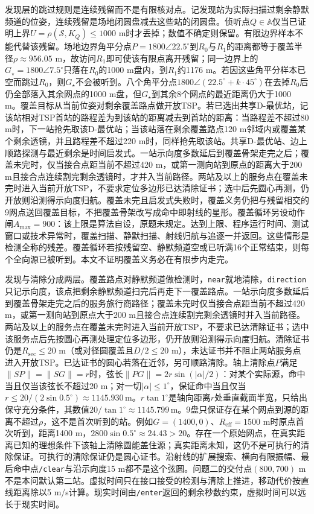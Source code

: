 \documentclass{cumcmthesis}
\begin{document}
发现层的跳过规则是连续残留而不是有限核对点。记发现站为实际扫描过剩余静默频道的位姿，连续残留是场地闭圆盘减去这些站的闭圆盘。侦听点$Q\in\mathbb{A}$仅当已证明上界$U=\rho(\mathcal{S},K_Q)\le 1000$ m时才丢掉；数值不确定则保留。有限边界样本不能代替该残留。场地边界角平分点$P=1800\angle 22.5^\circ$到$R_0$与$R_1$的距离都等于覆盖半径$\rho\approx 956.05$ m，故访问$R_1$即可使该有限点离开残留；同一边界上的$G_\star=1800\angle 7.5^\circ$只落在$R_0$的1000 m盘内，到$R_1$约1176 m。若因这些角平分样本已空而跳过$R_0$，则$G_\star$不会被听到。八个角平分点$1800\angle(22.5^\circ+k\cdot 45^\circ)$在去掉$R_0$后仍全部落入其余网点的1000 m盘，但$G_\star$到其余8个网点的最近距离仍大于1000 m。覆盖目标从当前位姿对剩余覆盖路点做开放TSP。若已选出共享D-最优站，记该站相对TSP首站的路程差为到该站的距离减去到首站的距离：当路程差不超过80 m时，下一站抢先取该D-最优站；当该站落在剩余覆盖路点120 m邻域内或覆盖某个剩余透镜，并且路程差不超过220 m时，同样抢先取该站。共享D-最优站、边上顺路探测与最近剩余是时间启发式。一站示向度多数延后到覆盖骨架走完之后；覆盖未完时，仅当接合点距当前不超过420 m，或第一测向站到原点的距离大于200 m且接合点连续割完剩余透镜时，才并入当前路径。两站及以上的服务点在覆盖未完时进入当前开放TSP，不要求定位多边形已达清除证书；选中后先圆心再测，仍开放则沿测得示向度归航。覆盖未完且启发式失败时，覆盖义务仍把与残留相交的9网点送回覆盖目标，不把覆盖骨架改写成命中即射线的星形。覆盖循环另设动作闸$A_{\max}=900$：该上限是算法自设，原题未规定。达到上限、程序运行时间、测试窗口或技术异常时，覆盖扫描、静默扫描、射线归航与追逐一并返回。这些情形是检测全称的残差。覆盖循环若按残留空、静默频道空或已听满16个正常结束，则每个全向源已被听到。本文不证明覆盖义务必在有限步内走完。

发现与清除分成两层。覆盖路点对静默频道做检测时，\texttt{near}就地清除，\texttt{direction}只记示向度，该点把剩余静默频道扫完后再走下一覆盖路点。一站示向度多数延后到覆盖骨架走完之后的服务旅行商路径；覆盖未完时仅当接合点距当前不超过420 m，或第一测向站到原点大于200 m且接合点连续割完剩余透镜时并入当前路径。两站及以上的服务点在覆盖未完时进入当前开放TSP，不要求已达清除证书；选中该服务点后先按圆心再测处理定位多边形，仍开放则沿测得示向度归航。清除证书仍是$R_{\mathrm{sec}}\le 20$ m（或对径圆覆盖且$D/2\le 20$ m），未达证书并不阻止两站服务点进入开放TSP。已达证书的圆心若落在近邻，另可顺路清除。轴上清除点$P$满足$\|SP\|=\|SG\|=r$时，弦长$\|PG\|=2r\sin(|\alpha|/2)$：对某个实际源，命中当且仅当该弦长不超过20 m；对一切$|\alpha|\le 1^\circ$，保证命中当且仅当$r\le 20/(2\sin 0.5^\circ)\approx 1145.930\,\mathrm{m}$。$r\tan 1^\circ$是轴向距离$r$处垂直截面半宽，只给出保守充分条件，其数值$20/\tan 1^\circ\approx 1145.799\,\mathrm{m}$。9盘只保证存在某个网点到源的距离不超过$\rho$，这不是首次听到的站。例如$G=(1400,0)$、$R_{\mathrm{eff}}=1500$ m时原点首次听到，距离1400 m，$2800\sin 0.5^\circ\approx 24.43>20$。存在一个原始网点，在真实距离已知的理想条件下该轴上清除圆能盖住源；真实距离未知，这仍不是可执行的清除保证。可执行的清除保证仍是圆心证书。沿射线的扩展搜索、横向有限振幅、最后命中点\texttt{/clear}与沿示向度15 m都不是这个弦圆。问题二的交付点$(800,700)$ m不是本问默认第二站。虚拟时间只在接口接受的检测与清除上推进，移动代价按直线距离除以5 m/s计算。现实时间由\texttt{/enter}返回的剩余秒数约束，虚拟时间可以远长于现实时间。
\end{document}
